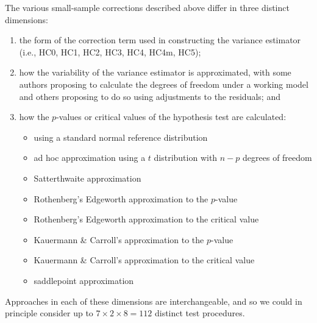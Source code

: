\documentclass{article}\usepackage[]{graphicx}\usepackage[]{color}
\begin{document}
The various small-sample corrections described above differ in three distinct dimensions:
\begin{enumerate}
\item the form of the correction term used in constructing the variance estimator (i.e., HC0, HC1, HC2, HC3, HC4, HC4m, HC5);
\item how the variability of the variance estimator is approximated, with some authors proposing to calculate the degrees of freedom under a working model and others proposing to do so using adjustments to the residuals; and
\item how the $p$-values or critical values of the hypothesis test are calculated:
\begin{itemize}
\item using a standard normal reference distribution
\item ad hoc approximation using a $t$ distribution with $n - p$ degrees of freedom
\item Satterthwaite approximation
\item Rothenberg's Edgeworth approximation to the $p$-value
\item Rothenberg's Edgeworth approximation to the critical value
\item Kauermann \& Carroll's approximation to the $p$-value
\item Kauermann \& Carroll's approximation to the critical value
\item saddlepoint approximation
\end{itemize}
\end{enumerate}
Approaches in each of these dimensions are interchangeable, and so we could in principle consider up to $7 \times 2 \times 8 = 112$ distinct test procedures. 
\end{document}
